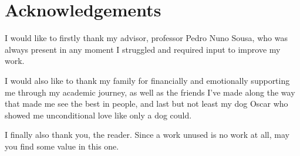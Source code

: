 \chapter{Acknowledgements}

    I would like to firstly thank my advisor, professor Pedro Nuno Sousa, who was always present in any moment I struggled and required input to improve my work.

    I would also like to thank my family for financially and emotionally supporting me through my academic journey, as well as the friends I've made along the way that made me see the best in people, and last but not least my dog Oscar who showed me unconditional love like only a dog could.

    I finally also thank you, the reader.
    Since a work unused is no work at all, may you find some value in this one.
